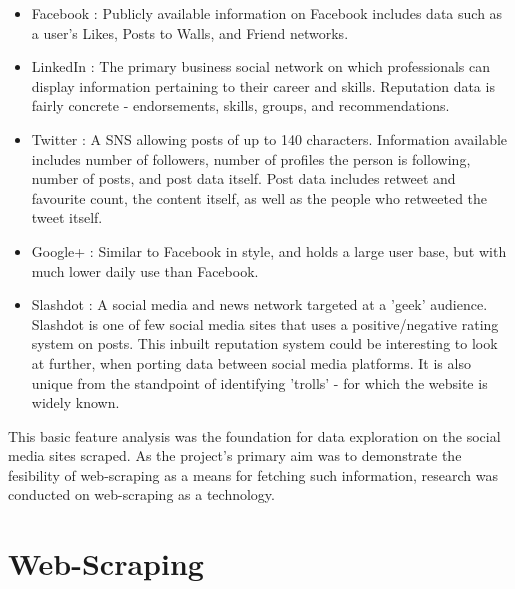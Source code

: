 




\begin{itemize}

\item Facebook \cite{facebook_site}: Publicly available information on Facebook includes data such as a user's Likes, Posts to Walls, and Friend networks. 
\item LinkedIn \cite{linkedin_site}: The primary business social network on which professionals can display information pertaining to their career and skills. Reputation data is fairly concrete - endorsements, skills, groups, and recommendations. 
\item Twitter \cite{twitter_site}: A SNS allowing posts of up to 140 characters. Information available includes number of followers, number of profiles the person is following, number of posts, and post data itself. Post data includes retweet and favourite count, the content itself, as well as the people who retweeted the tweet itself. 
\item Google+ \cite{google_site}: Similar to Facebook in style, and holds a large user base, but with much lower daily use than Facebook.
\item Slashdot \cite{slashdot_site}: A social media and news network targeted at a 'geek' audience. Slashdot is one of few social media sites that uses a positive/negative rating system on posts. This inbuilt reputation system could be interesting to look at further, when porting data between social media platforms. It is also unique from the standpoint of identifying 'trolls' - for which the website is widely known. 
\end{itemize}

This basic feature analysis was the foundation for data exploration on the social media sites scraped. As the project's primary aim was to demonstrate the fesibility of web-scraping as a means for fetching such information, research was conducted on web-scraping as a technology. 

\section{Web-Scraping}

